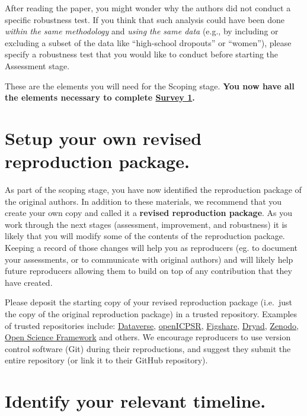 \documentclass[]{book}
\begin{document}
After reading the paper, you might wonder why the authors did not conduct a specific robustness test. If you think that such analysis could have been done \emph{within the same methodology} and \emph{using the same data} (e.g., by including or excluding a subset of the data like ``high-school dropouts'' or ``women''), please specify a robustness test that you would like to conduct before starting the Assessment stage.

These are the elements you will need for the Scoping stage. \textbf{You now have all the elements necessary to complete \href{https://berkeley.qualtrics.com/jfe/form/SV_2bO83uJvU9ZiTXv}{Survey 1}.}

\hypertarget{setup-your-own-revised-reproduction-package.}{%
\section{Setup your own revised reproduction package.}\label{setup-your-own-revised-reproduction-package.}}

As part of the scoping stage, you have now identified the reproduction package of the original authors. In addition to these materials, we recommend that you create your own copy and called it a \textbf{revised reproduction package}. As you work through the next stages (assessment, improvement, and robustness) it is likely that you will modify some of the contents of the reproduction package. Keeping a record of those changes will help you as reproducers (eg. to document your assessments, or to communicate with original authors) and will likely help future reproducers allowing them to build on top of any contribution that they have created.

Please deposit the starting copy of your revised reproduction package (i.e.~just the copy of the original reproduction package) in a trusted repository. Examples of trusted repositories include: \href{https://dataverse.org/}{Dataverse}, \href{https://www.openicpsr.org/openicpsr/}{openICPSR}, \href{https://figshare.com}{Figshare}, \href{https://datadryad.org/stash}{Dryad}, \href{https://about.zenodo.org/}{Zenodo}, \href{osf.io/}{Open Science Framework} and others. We encourage reproducers to use version control software (Git) during their reproductions, and suggest they submit the entire repository (or link it to their GitHub repository).

\hypertarget{identify-your-relevant-timeline.}{%
\section{Identify your relevant timeline.}\label{identify-your-relevant-timeline.}}
\end{document}
